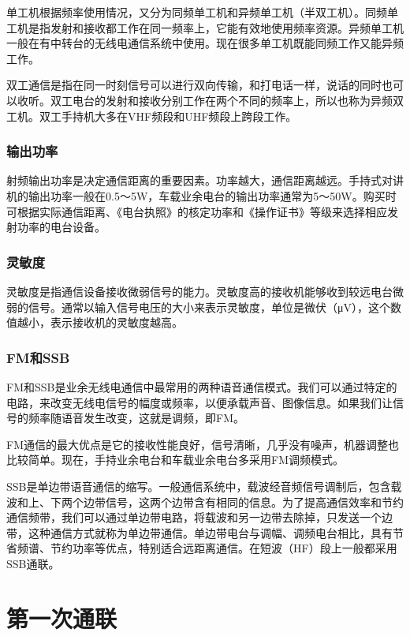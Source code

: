 \documentclass[12pt,UTF8]{ctexbook}
\begin{document}
单工机根据频率使用情况，又分为同频单工机和异频单工机（半双工机）。同频单工机是指发射和接收都工作在同一频率上，它能有效地使用频率资源。异频单工机一般在有中转台的无线电通信系统中使用。现在很多单工机既能同频工作又能异频工作。

双工通信是指在同一时刻信号可以进行双向传输，和打电话一样，说话的同时也可以收听。双工电台的发射和接收分别工作在两个不同的频率上，所以也称为异频双工机。双工手持机大多在VHF频段和UHF频段上跨段工作。

\subsection{输出功率}

射频输出功率是决定通信距离的重要因素。功率越大，通信距离越远。手持式对讲机的输出功率一般在0.5～5W，车载业余电台的输出功率通常为5～50W。购买时可根据实际通信距离、《电台执照》的核定功率和《操作证书》等级来选择相应发射功率的电台设备。

\subsection{灵敏度}

灵敏度是指通信设备接收微弱信号的能力。灵敏度高的接收机能够收到较远电台微弱的信号。通常以输入信号电压的大小来表示灵敏度，单位是微伏（μV），这个数值越小，表示接收机的灵敏度越高。

\subsection{FM和SSB}

FM和SSB是业余无线电通信中最常用的两种语音通信模式。我们可以通过特定的电路，来改变无线电信号的幅度或频率，以便承载声音、图像信息。如果我们让信号的频率随语音发生改变，这就是调频，即FM。

FM通信的最大优点是它的接收性能良好，信号清晰，几乎没有噪声，机器调整也比较简单。现在，手持业余电台和车载业余电台多采用FM调频模式。

SSB是单边带语音通信的缩写。一般通信系统中，载波经音频信号调制后，包含载波和上、下两个边带信号，这两个边带含有相同的信息。为了提高通信效率和节约通信频带，我们可以通过单边带电路，将载波和另一边带去除掉，只发送一个边带，这种通信方式就称为单边带通信。单边带电台与调幅、调频电台相比，具有节省频谱、节约功率等优点，特别适合远距离通信。在短波（HF）段上一般都采用SSB通联。

\chapter{第一次通联}
\end{document}
